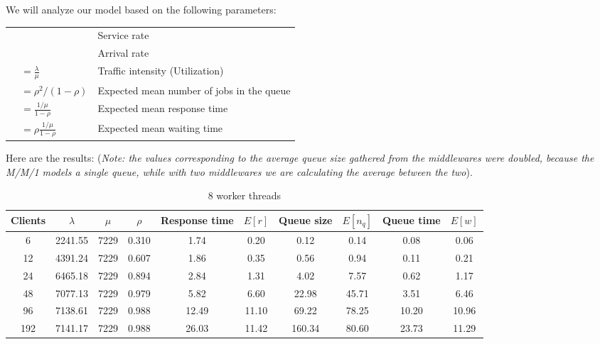 \documentclass[11pt,a4paper]{article}
\begin{document}
We will analyze our model based on the following parameters:

\vspace{1em}

\begin{center}
\begin{tabular}{lll}
	\bm{$\mu$} &  & Service rate \\ 
	\bm{$\lambda$} & & Arrival rate \\ 
	\bm{$\rho$} & $=\frac{\lambda}{\mu}$      & Traffic intensity (Utilization)  \\
	\bm{$E[n_q]$} & $=\rho^2/(1-\rho)$        & Expected mean number of jobs in the queue \\
	\bm{$E[r]$} & $=\frac{1/\mu}{1-\rho}$         & Expected mean response time \\
	\bm{$E[w]$} & $=\rho\frac{1/\mu}{1-\rho}$ & Expected mean waiting time \\
\end{tabular}
\end{center}

\vspace{1em}

Here are the results:
(\emph{Note: the values corresponding to the average queue size gathered from the middlewares
were doubled, because the M/M/1 models a single queue, while with two middlewares we are calculating
the average between the two}).

\begin{table}[H]
\centering
\begin{tabular}{@{}c|ccc|cc|cc|cc@{}}
\toprule
Clients & $\lambda$ & $\mu$ & $\rho$ & Response time & $E[r]$ & Queue size & $E[n_q]$ & Queue time & $E[w]$ \\ \midrule
6   & 2241.55 & 7229 & 0.310 & 1.74  & 0.20  & 0.12  & 0.14  & 0.08  & 0.06 \\
12  & 4391.24 & 7229 & 0.607 & 1.86  & 0.35  & 0.56  & 0.94  & 0.11  & 0.21 \\
24  & 6465.18 & 7229 & 0.894 & 2.84  & 1.31  & 4.02  & 7.57  & 0.62  & 1.17 \\
48  & 7077.13 & 7229 & 0.979 & 5.82  & 6.60  & 22.98 & 45.71 & 3.51  & 6.46 \\
96  & 7138.61 & 7229 & 0.988 & 12.49 & 11.10 & 69.22 & 78.25 & 10.20 & 10.96 \\
192 & 7141.17 & 7229 & 0.988 & 26.03 & 11.42 & 160.34 & 80.60 & 23.73 & 11.29 \\ \bottomrule
\end{tabular}
\caption{8 worker threads}
\end{table}
\end{document}
